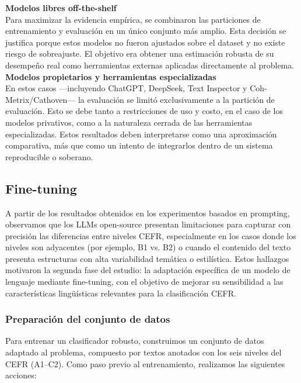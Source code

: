 \noindent\textbf{Modelos libres off-the-shelf}\\
Para maximizar la evidencia empírica, se combinaron las particiones de entrenamiento y evaluación en un único conjunto más amplio. Esta decisión se justifica porque estos modelos no fueron ajustados sobre el dataset y no existe riesgo de sobreajuste. El objetivo era obtener una estimación robusta de su desempeño real como herramientas externas aplicadas directamente al problema.\\

\noindent\textbf{Modelos propietarios y herramientas especializadas}\\
En estos casos —incluyendo ChatGPT, DeepSeek, Text Inspector y Coh-Metrix/Cathoven— la evaluación se limitó exclusivamente a la partición de evaluación. Esto se debe tanto a restricciones de uso y costo, en el caso de los modelos privativos, como a la naturaleza cerrada de las herramientas especializadas.
Estos resultados deben interpretarse como una aproximación comparativa, más que como un intento de integrarlos dentro de un sistema reproducible o soberano.

\subsection{Fine-tuning}\label{subsection:clas_finetuning}
A partir de los resultados obtenidos en los experimentos basados en prompting, observamos que los LLMs open-source presentan limitaciones para capturar con precisión las diferencias entre niveles CEFR, especialmente en los casos donde los niveles son adyacentes (por ejemplo, B1 vs. B2) o cuando el contenido del texto presenta estructuras con alta variabilidad temática o estilística. Estos hallazgos motivaron la segunda fase del estudio: la adaptación específica de un modelo de lenguaje mediante fine-tuning, con el objetivo de mejorar su sensibilidad a las características lingüísticas relevantes para la clasificación CEFR.

\subsubsection{Preparación del conjunto de datos}

Para entrenar un clasificador robusto, construimos un conjunto de datos adaptado al problema, compuesto por textos anotados con los seis niveles del CEFR (A1–C2). Como paso previo al entrenamiento, realizamos las siguientes acciones:

